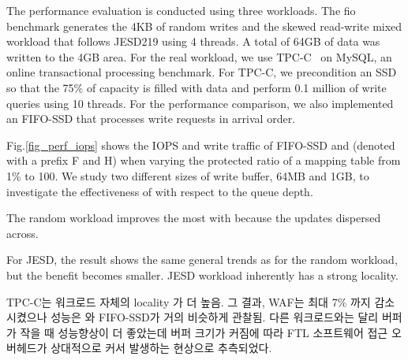 The performance evaluation is conducted using three workloads.
The fio benchmark generates the 4KB of random writes and the
skewed read-write mixed workload that follows JESD219 using 4 threads. A
total of 64GB of data was written to the 4GB area. For the real workload, we use 
TPC-C~\cite{council1990tpc} on MySQL, an online transactional processing benchmark.
For TPC-C, we precondition an SSD so that the 75\% of capacity is filled with data
and perform 0.1 million of write queries using 10 threads.
For the performance comparison, we also implemented an FIFO-SSD that processes 
write requests in arrival order.  

Fig.\ref{fig_perf_iops} shows the IOPS and write traffic of FIFO-SSD and \ours{} (denoted with a prefix F and H) when varying the protected ratio of a mapping table from 1\% to 100. 
We study two different sizes of write
buffer, 64MB and 1GB, to investigate the effectiveness of \ours{} with respect
to the queue depth. 

The random workload improves the most with \ours{} because the updates dispersed across.  

For JESD, the result shows the same general trends as for the random workload, but the benefit 
becomes smaller. JESD workload inherently has a strong locality. 

TPC-C는 워크로드 자체의 locality 가 더 높음. 그 결과, WAF는 최대 7\% 까지 감소시켰으나 성능은 \ours{}와 FIFO-SSD가 거의 비슷하게 관찰됨. 
다른 워크로드와는 달리 버퍼가 작을 때 성능향상이 더 좋았는데 버퍼 크기가 커짐에 따라 FTL 소프트웨어 접근 오버헤드가 상대적으로 커서 발생하는  현상으로 추측되었다. 

